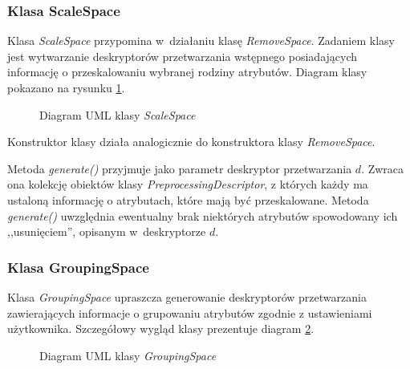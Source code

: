 \documentclass[../thesis.tex]{subfiles}
\begin{document}
\subsubsection{Klasa ScaleSpace}

Klasa \emph{ScaleSpace} przypomina w~działaniu klasę \emph{RemoveSpace}. Zadaniem klasy jest wytwarzanie deskryptorów przetwarzania wstępnego posiadających informację o przeskalowaniu wybranej rodziny atrybutów. Diagram klasy pokazano na rysunku \ref{proj:diagram_scale_space}.

\begin{figure}[h]
\centering
{}
\caption{Diagram UML klasy \emph{ScaleSpace}}
\label{proj:diagram_scale_space}
\end{figure}

Konstruktor klasy działa analogicznie do konstruktora klasy \emph{RemoveSpace}. 

Metoda \emph{generate()} przyjmuje jako parametr deskryptor przetwarzania $d$. Zwraca ona kolekcję obiektów klasy \emph{PreprocessingDescriptor}, z których każdy ma ustaloną informację o atrybutach, które mają być przeskalowane. Metoda \emph{generate()} uwzględnia ewentualny brak niektórych atrybutów spowodowany ich ,,usunięciem'', opisanym w~deskryptorze $d$.

\subsubsection{Klasa GroupingSpace}

Klasa \emph{GroupingSpace} upraszcza generowanie deskryptorów przetwarzania zawierających informacje o grupowaniu atrybutów zgodnie z ustawieniami użytkownika. Szczegółowy wygląd klasy prezentuje diagram \ref{proj:diagram_grouping_space}.

\begin{figure}[h]
\centering
{}
\caption{Diagram UML klasy \emph{GroupingSpace}}
\label{proj:diagram_grouping_space}
\end{figure}
\end{document}

